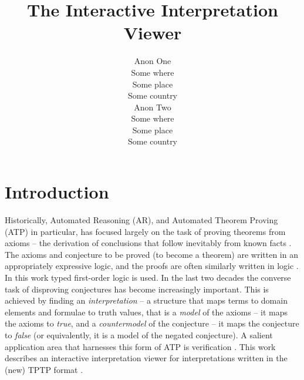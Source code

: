 \documentclass[letterpaper]{article}
\begin{document}
\title{The Interactive Interpretation Viewer}
\author{Anon One\\
Some where\\
Some place\\
Some country\\
\And
Anon Two\\
Some where\\
Some place\\
Some country}

\maketitle
\section{Introduction}
\label{Introduction}

Historically, Automated Reasoning (AR), and Automated Theorem Proving (ATP) in particular, has 
focused largely on the task of proving theorems from axioms -- the derivation of conclusions that 
follow inevitably from known facts \cite{RV01-HAR}.
The axioms and conjecture to be proved (to become a theorem) are written in an 
appropriately expressive logic, and the proofs are often similarly written in logic \cite{SS+06}.
In this work typed first-order logic is used.
In the last two decades the converse task of disproving conjectures has become increasingly 
important.
This is achieved by finding an {\em interpretation} -- a structure that maps terms to domain 
elements and formulae to truth values, that is a {\em model} of the axioms -- it maps the axioms to 
{\em true}, and a {\em countermodel} of the conjecture -- it maps the conjecture to {\em false}
(or equivalently, it is a model of the negated conjecture).
A salient application area that harnesses this form of ATP is verification \cite{DKW08}.
This work describes an interactive interpretation viewer for interpretations written in the
(new) TPTP format \cite{SS+22-FLAIRS}.
\end{document}

